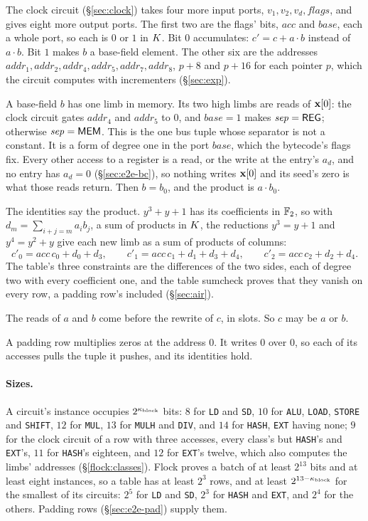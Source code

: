 The clock circuit (\S\ref{sec:clock}) takes four more input ports, $v_1,v_2,v_d,\mathit{flags}$, and gives eight more output ports. The first two are the flags' bits, $\mathit{acc}$ and $\mathit{base}$, each a whole port, so each is $0$ or $1$ in $K$. Bit $0$ accumulates: $c'=c+a\cdot b$ instead of $a\cdot b$. Bit $1$ makes $b$ a base-field element. The other six are the addresses $\mathit{addr}_1,\mathit{addr}_2,\mathit{addr}_4,\mathit{addr}_5,\mathit{addr}_7,\mathit{addr}_8$, $p+8$ and $p+16$ for each pointer $p$, which the circuit computes with incrementers (\S\ref{sec:exp}).

A base-field $b$ has one limb in memory. Its two high limbs are reads of $\mathbf{x}[0]$: the clock circuit gates $\mathit{addr}_4$ and $\mathit{addr}_5$ to $0$, and $\mathit{base}=1$ makes $\mathit{sep}=\mathsf{REG}$; otherwise $\mathit{sep}=\mathsf{MEM}$. This is the one bus tuple whose separator is not a constant. It is a form of degree one in the port $\mathit{base}$, which the bytecode's flags fix. Every other access to a register is a read, or the write at the entry's $a_d$, and no entry has $a_d=0$ (\S\ref{sec:e2e-bc}), so nothing writes $\mathbf{x}[0]$ and its seed's zero is what those reads return. Then $b=b_0$, and the product is $a\cdot b_0$.

The identities say the product. $y^3+y+1$ has its coefficients in $\mathbb{F}_2$, so with $d_m=\sum_{i+j=m}a_ib_j$, a sum of products in $K$, the reductions $y^3=y+1$ and $y^4=y^2+y$ give each new limb as a sum of products of columns:
\[
  c'_0=\mathit{acc}\,c_0+d_0+d_3,\qquad c'_1=\mathit{acc}\,c_1+d_1+d_3+d_4,\qquad c'_2=\mathit{acc}\,c_2+d_2+d_4.
\]
The table's three constraints are the differences of the two sides, each of degree two with every coefficient one, and the table sumcheck proves that they vanish on every row, a padding row's included (\S\ref{sec:air}).

The reads of $a$ and $b$ come before the rewrite of $c$, in slots. So $c$ may be $a$ or $b$.

A padding row multiplies zeros at the address $0$. It writes $0$ over $0$, so each of its accesses pulls the tuple it pushes, and its identities hold.

\paragraph{Sizes.} A circuit's instance occupies $2^{\kappa_{\mathrm{block}}}$ bits: $8$ for \texttt{LD} and \texttt{SD}, $10$ for \texttt{ALU}, \texttt{LOAD}, \texttt{STORE} and \texttt{SHIFT}, $12$ for \texttt{MUL}, $13$ for \texttt{MULH} and \texttt{DIV}, and $14$ for \texttt{HASH}, \texttt{EXT} having none; $9$ for the clock circuit of a row with three accesses, every class's but \texttt{HASH}'s and \texttt{EXT}'s, $11$ for \texttt{HASH}'s eighteen, and $12$ for \texttt{EXT}'s twelve, which also computes the limbs' addresses (\S\ref{flock:classes}). Flock proves a batch of at least $2^{13}$ bits and at least eight instances, so a table has at least $2^{3}$ rows, and at least $2^{13-\kappa_{\mathrm{block}}}$ for the smallest of its circuits: $2^{5}$ for \texttt{LD} and \texttt{SD}, $2^{3}$ for \texttt{HASH} and \texttt{EXT}, and $2^{4}$ for the others. Padding rows (\S\ref{sec:e2e-pad}) supply them.
